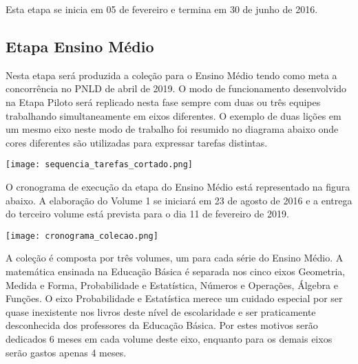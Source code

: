 \documentclass[10 pt]{article}
\begin{document}
Esta etapa se inicia em 05 de fevereiro e termina em 30 de junho de 2016.

\subsection{Etapa Ensino Médio}

Nesta etapa será produzida a coleção para o Ensino Médio tendo como meta a concorrência no PNLD de abril de 2019.
O modo de funcionamento desenvolvido na Etapa Piloto será replicado nesta fase sempre com duas ou três equipes trabalhando simultaneamente em eixos diferentes.
O exemplo de duas lições em um mesmo eixo neste modo de trabalho foi resumido no diagrama abaixo onde cores diferentes são utilizadas para expressar tarefas distintas.

\noindent\texttt{[image: sequencia\_tarefas\_cortado.png]}

O cronograma de execução da etapa do Ensino Médio está representado na figura abaixo. A elaboração do Volume 1 se iniciará em 23 de agosto de 2016 e a entrega do terceiro volume está prevista para o dia 11 de fevereiro de 2019.

\noindent\texttt{[image: cronograma\_colecao.png]}
\vspace{0.2 cm}

\vspace{0.2 cm}

A coleção é composta por três volumes, um para cada série do Ensino Médio. A matemática ensinada na Educação Básica é separada nos cinco eixos  Geometria, Medida e Forma, Probabilidade e Estatística, Números e Operações, Álgebra e Funções. O eixo Probabilidade e Estatística merece um cuidado especial por ser quase inexistente nos livros deste nível de escolaridade e ser praticamente desconhecida dos professores da Educação Básica. Por estes motivos serão dedicados 6 meses em cada volume deste eixo, enquanto para os demais eixos serão gastos apenas 4 meses.
\end{document}
